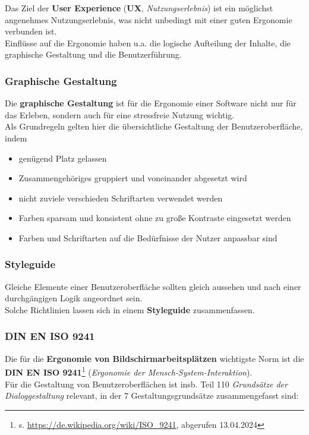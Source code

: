 \noindent
Das Ziel der \textbf{User Experience} (\textbf{UX}, \textit{Nutzungserlebnis}) ist ein möglichst angenehmes Nutzungserlebnis, was nicht unbedingt mit einer guten Ergonomie verbunden ist.\\

\noindent
Einflüsse auf die Ergonomie haben u.a. die logische Aufteilung der Inhalte, die graphische Gestaltung und die Benutzerführung.

\subsubsection*{Graphische Gestaltung}
Die \textbf{graphische Gestaltung} ist für die Ergonomie einer Software nicht nur für das Erleben, sondern auch für eine stressfreie Nutzung wichtig.\\

\noindent
Als Grundregeln gelten hier die übersichtliche Gestaltung der Benutzeroberfläche, indem

\begin{itemize}
    \item genügend Platz gelassen
    \item Zusammengehöriges gruppiert und voneinander abgesetzt wird
    \item nicht zuviele verschieden Schriftarten verwendet werden
    \item Farben sparsam und konsistent ohne zu große Kontraste eingesetzt werden
    \item Farben und Schriftarten auf die Bedürfnisse der Nutzer anpassbar sind
\end{itemize}

\subsubsection*{Styleguide}
Gleiche Elemente einer Benutzeroberfläche sollten gleich aussehen und nach einer durchgängigen Logik angeordnet sein.\\
Solche Richtlinien lassen sich in einem \textbf{Styleguide} zusammenfassen.

\subsubsection*{DIN EN ISO 9241}
Die für die \textbf{Ergonomie von Bildschirmarbeitsplätzen} wichtigste Norm ist die \textbf{DIN EN ISO 9241}\footnote{
s. \url{https://de.wikipedia.org/wiki/ISO_9241}, abgerufen 13.04.2024
} (\textit{Ergonomie der Mensch-System-Interaktion}).\\
Für die Gestaltung von Benutzeroberflächen ist insb. Teil 110 \textit{Grundsätze der Dialoggestaltung} relevant, in der 7 Gestaltungsgrundsätze zusammengefasst sind:

